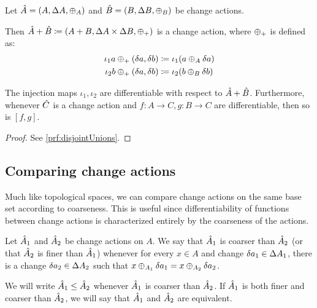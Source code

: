 \begin{prop}[name=Disjoint unions, restate=disjointUnions]
  \label{prop:disjointUnions}
  Let $\hat{A} = (A,\Delta A,\oplus_A)$ and $\hat{B} =
  (B,\Delta B,\oplus_B)$ be change actions.

  Then $\hat{A} + \hat{B} \coloneqq (A + B,\Delta A \times
  \Delta B,\oplus_{+})$ is a change action, where $\oplus_{+}$ is defined as:
  \begin{align*}
    \iota_1 a \oplus_{+} (\delta a, \delta b) &\coloneqq \iota_1 (a \oplus_A \delta a)\\
    \iota_2 b \oplus_{+} (\delta a, \delta b) &\coloneqq \iota_2 (b \oplus_B \delta b)
  \end{align*}
  
  The injection maps $\iota_1, \iota_2$ are differentiable with respect to $\hat{A} + \hat{B}$. Furthermore,
  whenever $\hat{C}$ is a change action and $f : A \rightarrow C, g: B \rightarrow C$ are differentiable,
  then so is $\left[ f, g \right]$.
\end{prop}
\ifproofs
\begin{proof}
  See \cref{prf:disjointUnions}.
\end{proof}
\fi

\subsection{Comparing change actions}

Much like topological spaces, we can compare change actions on the same
base set according to coarseness. This 
is useful since differentiability of functions between change actions is characterized
entirely by the coarseness of the actions.

\begin{defn}
  Let $\hat{A}_1$ and $ \hat{A}_2$ be 
  change actions on $A$. We say that $\hat{A}_1$ is coarser than $\hat{A}_2$ (or that $\hat{A}_2$ is finer
  than $\hat{A}_1$) whenever for every $x \in A$ and change $\delta a_1 \in
  \Delta A_1$, there is a change $\delta a_2 \in
  \Delta A_2$ such that $x \oplus_{A_1} \delta a_1 = x \oplus_{A_2} \delta a_2$.
  
  We will write $\hat{A}_1 \leq \hat{A}_2$ whenever $\hat{A}_1$ is coarser than $\hat{A}_2$.
  If $\hat{A}_1$ is both finer and coarser than $\hat{A}_2$, we will say that $\hat{A}_1$
  and $\hat{A}_2$ are equivalent.
\end{defn}

